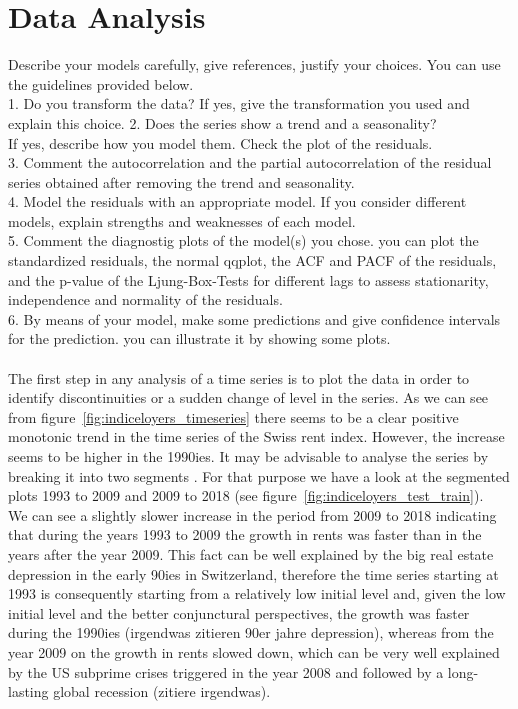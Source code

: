\documentclass[11pt,a4paper]{article}
\begin{document}
\section{Data Analysis}
Describe your models carefully, give references, justify your choices. You can use the guidelines provided below.
\\1. Do you transform the data? If yes, give the transformation you used and explain this choice. 2. Does the series show a trend and a seasonality? 
\\If yes, describe how you model them. Check the plot of the residuals. 
\\3. Comment the autocorrelation and the partial autocorrelation of the residual series obtained after removing the trend and seasonality.
\\4. Model the residuals with an appropriate model. If you consider different models, explain strengths and weaknesses of each model.
\\5. Comment the diagnostig plots of the model(s) you chose. you can plot the standardized residuals, the normal qqplot, the ACF and PACF of the residuals, and the p-value of the Ljung-Box-Tests \citep{LjungBox78} for different lags to assess stationarity, independence and normality of the residuals.
\\6. By means of your model, make some predictions and give confidence intervals for the prediction. you can illustrate it by showing some plots.
\\
\\
The first step in any analysis of a time series is to plot the data in order to identify discontinuities or a sudden change of level in the series\cite[p.~23]{bd02}. As we can see from figure~\ref{fig:indiceloyers_timeseries} there seems to be a clear positive monotonic trend in the time series of the Swiss rent index. However, the increase seems to be higher in the 1990ies. It may be advisable to analyse the series by breaking it into two segments \cite[p.~23]{bd02} . For that purpose we have a look at the segmented plots 1993 to 2009 and 2009 to 2018 (see figure~\ref{fig:indiceloyers_test_train}). \\
We can see a slightly slower increase in the period from 2009 to 2018 indicating that during the years 1993 to 2009 the growth in rents was faster than in the years after the year 2009. This fact can be well explained by the big real estate depression in the early 90ies in Switzerland, therefore the time series starting at 1993 is consequently starting from a relatively low initial level and, given the low initial level and the better conjunctural perspectives, the growth  was faster during the 1990ies (irgendwas zitieren 90er jahre depression), whereas from the year 2009 on the growth in rents slowed down, which can be very well explained by the US subprime crises triggered in the year 2008 and followed by a long-lasting global recession (zitiere irgendwas). \\
\end{document}
